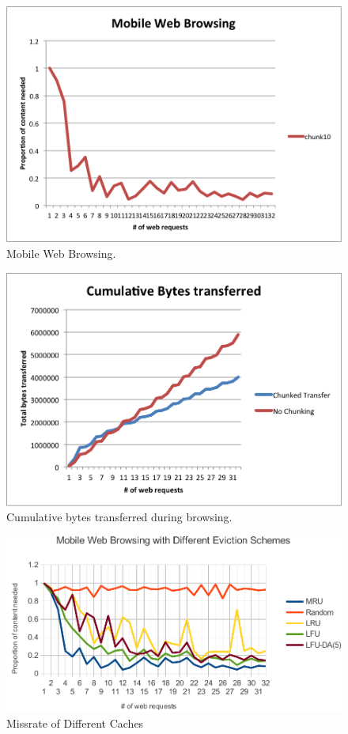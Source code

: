 \begin{figure}[h] 
\centering \includegraphics[scale=0.40]{images/browsing.png}
\caption{Mobile Web Browsing. }
\end{figure}

\begin{figure}[h] 

\centering \includegraphics[scale=0.40]{images/cumulbrowsing.png}
\caption{Cumulative bytes transferred during browsing. }

\end{figure}

\begin{figure}[h]
\centering \includegraphics[width=\columnwidth]{images/caches.pdf}
\caption{Missrate of Different Caches}
\label{fig:cache_missrate}
\end{figure}

